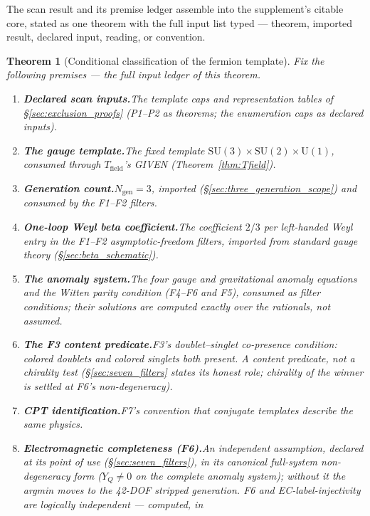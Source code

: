 \documentclass[11pt]{article}
\newtheorem{theorem}{Theorem}[section]
\theoremstyle{definition}
\newcommand{\SU}{\mathrm{SU}}
\newcommand{\U}{\mathrm{U}}
\begin{document}
The scan result and its premise ledger assemble into the
supplement's citable core, stated as one theorem with the full input
list typed --- theorem, imported result, declared input, reading, or
convention.

\begin{theorem}[Conditional classification of the fermion template]
\label{thm:conditional_classification}
Fix the following premises --- the full input ledger of this theorem.
\begin{enumerate}[label=(C\arabic*),nosep]
  \item \textbf{Declared scan inputs.}\quad The template caps and
  representation tables of \S\ref{sec:exclusion_proofs} (P1--P2 as
  theorems; the enumeration caps as declared inputs).
  \item \textbf{The gauge template.}\quad The fixed template
  $\SU(3)\times\SU(2)\times\U(1)$, consumed through
  $T_{\mathrm{field}}$'s GIVEN (Theorem~\ref{thm:Tfield}).
  \item \textbf{Generation count.}\quad $N_{\mathrm{gen}} = 3$,
  imported (\S\ref{sec:three_generation_scope}) and consumed by the
  F1--F2 filters.
  \item \textbf{One-loop Weyl beta coefficient.}\quad The
  coefficient $2/3$ per left-handed Weyl entry in the F1--F2
  asymptotic-freedom filters, imported from standard gauge theory
  (\S\ref{sec:beta_schematic}).
  \item \textbf{The anomaly system.}\quad The four gauge and
  gravitational anomaly equations and the Witten parity condition
  (F4--F6 and F5), consumed as filter conditions; their solutions are
  computed exactly over the rationals, not assumed.
  \item \textbf{The F3 content predicate.}\quad F3's
  doublet--singlet co-presence condition: colored doublets and
  colored singlets both present.  A content predicate, not a
  chirality test (\S\ref{sec:seven_filters} states its honest role;
  chirality of the winner is settled at F6's non-degeneracy).
  \item \textbf{CPT identification.}\quad F7's convention that
  conjugate templates describe the same physics.
  \item \textbf{Electromagnetic completeness (F6).}\quad An
  independent assumption, declared at its point of use
  (\S\ref{sec:seven_filters}), in its canonical full-system
  non-degeneracy form ($Y_Q \neq 0$ on the complete anomaly system);
  without it the argmin moves to the 42-DOF stripped generation.  F6
  and EC-label-injectivity are logically independent --- computed, in

\end{enumerate}
\end{theorem}
\end{document}
